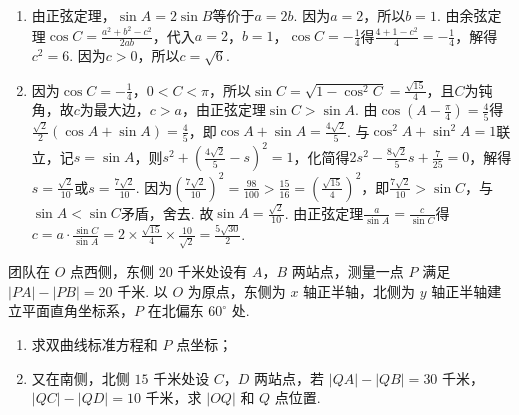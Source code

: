 \begin{solution}
\begin{enumerate}\item 由正弦定理，\(\sin A=2\sin B\)等价于\(a=2b\). 因为\(a=2\)，所以\(b=1\). 由余弦定理\(\cos C=\frac{a^{2}+b^{2}-c^{2}}{2ab}\)，代入\(a=2\)，\(b=1\)，\(\cos C=-\frac{1}{4}\)得\(\frac{4+1-c^{2}}{4}=-\frac{1}{4}\)，解得\(c^{2}=6\). 因为\(c>0\)，所以\(c=\sqrt{6}\). \item 因为\(\cos C=-\frac{1}{4}\)，\(0<C<\pi\)，所以\(\sin C=\sqrt{1-\cos^{2}C}=\frac{\sqrt{15}}{4}\)，且\(C\)为钝角，故\(c\)为最大边，\(c>a\)，由正弦定理\(\sin C>\sin A\). 由\(\cos\left(A-\frac{\pi}{4}\right)=\frac{4}{5}\)得\(\frac{\sqrt{2}}{2}(\cos A+\sin A)=\frac{4}{5}\)，即\(\cos A+\sin A=\frac{4\sqrt{2}}{5}\). 与\(\cos^{2}A+\sin^{2}A=1\)联立，记\(s=\sin A\)，则\(s^{2}+\left(\frac{4\sqrt{2}}{5}-s\right)^{2}=1\)，化简得\(2s^{2}-\frac{8\sqrt{2}}{5}s+\frac{7}{25}=0\)，解得\(s=\frac{\sqrt{2}}{10}\)或\(s=\frac{7\sqrt{2}}{10}\). 因为\(\left(\frac{7\sqrt{2}}{10}\right)^{2}=\frac{98}{100}>\frac{15}{16}=\left(\frac{\sqrt{15}}{4}\right)^{2}\)，即\(\frac{7\sqrt{2}}{10}>\sin C\)，与\(\sin A<\sin C\)矛盾，舍去. 故\(\sin A=\frac{\sqrt{2}}{10}\). 由正弦定理\(\frac{a}{\sin A}=\frac{c}{\sin C}\)得\(c=a\cdot\frac{\sin C}{\sin A}=2\times\frac{\sqrt{15}}{4}\times\frac{10}{\sqrt{2}}=\frac{5\sqrt{30}}{2}\). \end{enumerate}
\end{solution}

\begin{problem}
团队在 \(O\) 点西侧，东侧 \(20\) 千米处设有 \(A\)，\(B\) 两站点，测量一点 \(P\) 满足 \(|PA|-|PB|=20\) 千米. 以 \(O\) 为原点，东侧为 \(x\) 轴正半轴，北侧为 \(y\) 轴正半轴建立平面直角坐标系，\(P\) 在北偏东 \(60^\circ\) 处.
\begin{enumerate}
\item 求双曲线标准方程和 \(P\) 点坐标；
\item 又在南侧，北侧 \(15\) 千米处设 \(C\)，\(D\) 两站点，若 \(|QA|-|QB|=30\) 千米，\(|QC|-|QD|=10\) 千米，求 \(|OQ|\) 和 \(Q\) 点位置.
\end{enumerate}
\end{problem}

